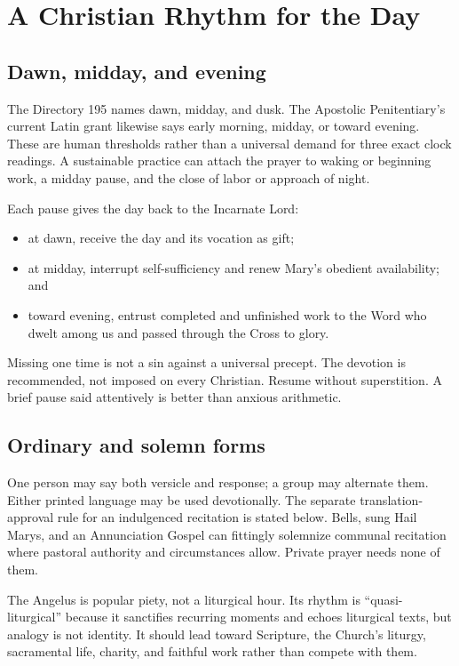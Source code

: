 \section{A Christian Rhythm for the Day}

\subsection{Dawn, midday, and evening}

The Directory 195 names dawn, midday, and dusk. The Apostolic Penitentiary's current Latin grant likewise says early morning, midday, or toward evening. These are human thresholds rather than a universal demand for three exact clock readings. A sustainable practice can attach the prayer to waking or beginning work, a midday pause, and the close of labor or approach of night.

Each pause gives the day back to the Incarnate Lord:

\begin{itemize}
  \item at dawn, receive the day and its vocation as gift;
  \item at midday, interrupt self-sufficiency and renew Mary's obedient availability; and
  \item toward evening, entrust completed and unfinished work to the Word who dwelt among us and passed through the Cross to glory.
\end{itemize}

Missing one time is not a sin against a universal precept. The devotion is recommended, not imposed on every Christian. Resume without superstition. A brief pause said attentively is better than anxious arithmetic.

\subsection{Ordinary and solemn forms}

One person may say both versicle and response; a group may alternate them. Either printed language may be used devotionally. The separate translation-approval rule for an indulgenced recitation is stated below. Bells, sung Hail Marys, and an Annunciation Gospel can fittingly solemnize communal recitation where pastoral authority and circumstances allow. Private prayer needs none of them.

The Angelus is popular piety, not a liturgical hour. Its rhythm is ``quasi-liturgical'' because it sanctifies recurring moments and echoes liturgical texts, but analogy is not identity. It should lead toward Scripture, the Church's liturgy, sacramental life, charity, and faithful work rather than compete with them.

